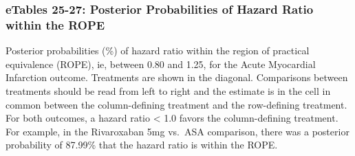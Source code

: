 \documentclass[
  12pt,
]{article}
\begin{document}
\begin{landscape}

\hypertarget{etables-25-27-posterior-probabilities-of-hazard-ratio-within-the-rope}{%
\subsubsection{eTables 25-27: Posterior Probabilities of Hazard Ratio
within the
ROPE}\label{etables-25-27-posterior-probabilities-of-hazard-ratio-within-the-rope}}

\begin{table}[!h]

\caption{\label{tab:unnamed-chunk-47}Acute Myocardial Infarction}
\centering
{}
\end{table}

Posterior probabilities (\%) of hazard ratio within the region of
practical equivalence (ROPE), ie, between 0.80 and 1.25, for the Acute
Myocardial Infarction outcome. Treatments are shown in the diagonal.
Comparisons between treatments should be read from left to right and the
estimate is in the cell in common between the column-defining treatment
and the row-defining treatment. For both outcomes, a hazard ratio
\textless{} 1.0 favors the column-defining treatment. For example, in
the Rivaroxaban 5mg vs.~ASA comparison, there was a posterior
probability of 87.99\% that the hazard ratio is within the ROPE.

\end{landscape}

\begin{table}[!h]

\caption{\label{tab:unnamed-chunk-48}Ischemic Stroke}
\centering
{}
\end{table}
\end{document}
